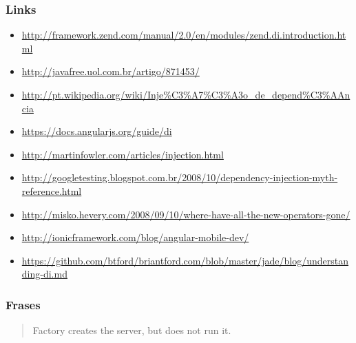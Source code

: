 \begin{frame}[fragile]\frametitle{Links}

\begin{itemize}
\item
  \url{http://framework.zend.com/manual/2.0/en/modules/zend.di.introduction.html}
\item
  \url{http://javafree.uol.com.br/artigo/871453/}
\item
  \url{http://pt.wikipedia.org/wiki/Inje%C3%A7%C3%A3o_de_depend%C3%AAncia}
\item
  \url{https://docs.angularjs.org/guide/di}
\item
  \url{http://martinfowler.com/articles/injection.html}
\item
  \url{http://googletesting.blogspot.com.br/2008/10/dependency-injection-myth-reference.html}
\item
  \url{http://misko.hevery.com/2008/09/10/where-have-all-the-new-operators-gone/}
\item
  \url{http://ionicframework.com/blog/angular-mobile-dev/}
\item
  \url{https://github.com/btford/briantford.com/blob/master/jade/blog/understanding-di.md}
\end{itemize}
\end{frame}

\begin{frame}\frametitle{Frases}

\begin{quote}
Factory creates the server, but does not run it.

\end{quote}
\end{frame}
